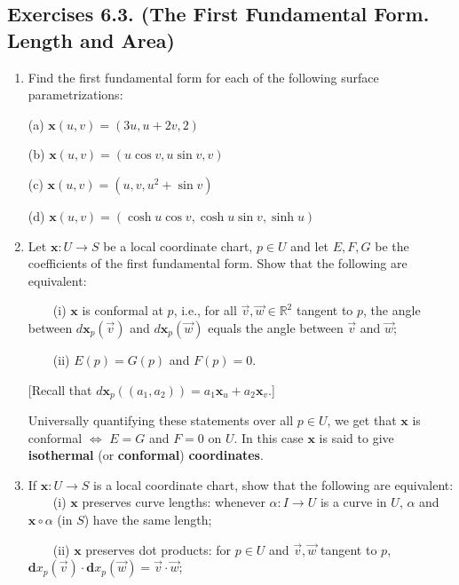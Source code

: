 \documentclass[leqno]{book}
\begin{document}
\subsection*{Exercises 6.3. (The First Fundamental Form.  Length and Area)} %
\begin{enumerate}
\item Find the first fundamental form for each of the following surface parametrizations:

(a) $\mathbf x(u,v)=(3u,u+2v,2)$

(b) $\mathbf x(u,v)=(u\cos v,u\sin v,v)$

(c) $\mathbf x(u,v)=(u,v,u^2+\sin v)$

(d) $\mathbf x(u,v)=(\cosh u\cos v,\cosh u\sin v,\sinh u)$

\item Let $\mathbf x:U\to S$ be a local coordinate chart, $p\in U$ and let $E,F,G$ be the coefficients of the first fundamental form.  Show that the following are equivalent:

~~~~(i) $\mathbf x$ is conformal at $p$, i.e., for all $\vec v,\vec w\in\mathbb R^2$ tangent to $p$, the angle between $d\mathbf x_p(\vec v)$ and $d\mathbf x_p(\vec w)$ equals the angle between $\vec v$ and $\vec w$;

~~~~(ii) $E(p)=G(p)$ and $F(p)=0$.

[Recall that $d\mathbf x_p((a_1,a_2))=a_1\mathbf x_u+a_2\mathbf x_v$.]

Universally quantifying these statements over all $p\in U$, we get that $\mathbf x$ is conformal $\iff$ $E=G$ and $F=0$ on $U$.  In this case $\mathbf x$ is said to give \textbf{isothermal} (or \textbf{conformal}) \textbf{coordinates}.

\item If $\mathbf x:U\to S$ is a local coordinate chart, show that the following are equivalent:\\

~~~~(i) $\mathbf x$ preserves curve lengths: whenever $\alpha:I\to U$ is a curve in $U$, $\alpha$ and $\mathbf x\circ\alpha$ (in $S$) have the same length;

~~~~(ii) $\mathbf x$ preserves dot products: for $p\in U$ and $\vec v,\vec w$ tangent to $p$, $\mathbf dx_p(\vec v)\cdot\mathbf dx_p(\vec w)=\vec v\cdot\vec w$;


\end{enumerate}
\end{document}
